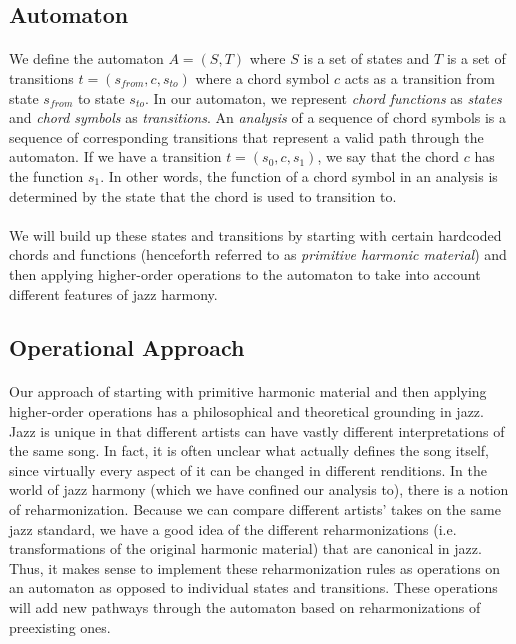 \documentclass[]{article}
\begin{document}
\subsection{Automaton}
\paragraph{} We define the automaton $A = (S, T)$ where $S$ is a set of states and $T$ is a set of transitions $t = (s_{from}, c, s_{to})$ where a chord symbol $c$ acts as a transition from state $s_{from}$ to state $s_{to}$.  In our automaton, we represent \textit{chord functions} as \textit{states} and \textit{chord symbols} as \textit{transitions}.  An \textit{analysis} of a sequence of chord symbols is a sequence of corresponding transitions that represent a valid path through the automaton.  If we have a transition $t = (s_0, c, s_1)$, we say that the chord $c$ has the function $s_1$.  In other words, the function of a chord symbol in an analysis is determined by the state that the chord is used to transition to.

\paragraph{} We will build up these states and transitions by starting with certain hardcoded chords and functions (henceforth referred to as \textit{primitive harmonic material}) and then applying higher-order operations to the automaton to take into account different features of jazz harmony.

\subsection{Operational Approach}
\paragraph{} Our approach of starting with primitive harmonic material and then applying higher-order operations has a philosophical and theoretical grounding in jazz.  Jazz is unique in that different artists can have vastly different interpretations of the same song.  In fact, it is often unclear what actually defines the song itself, since virtually every aspect of it can be changed in different renditions.  In the world of jazz harmony (which we have confined our analysis to), there is a notion of reharmonization.  Because we can compare different artists' takes on the same jazz standard, we have a good idea of the different reharmonizations (i.e. transformations of the original harmonic material) that are canonical in jazz.  Thus, it makes sense to implement these reharmonization rules as operations on an automaton as opposed to individual states and transitions.  These operations will add new pathways through the automaton based on reharmonizations of preexisting ones.
\end{document}
